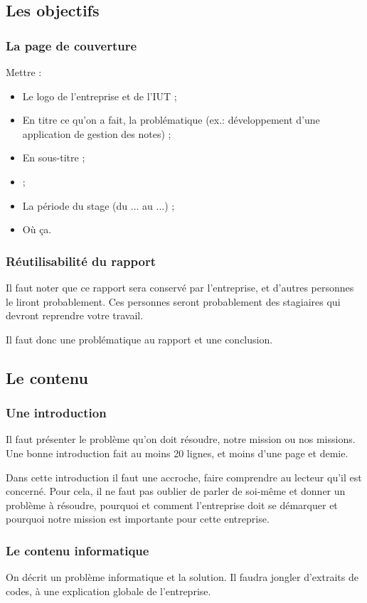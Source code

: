 \documentclass[final, a4paper, 11pt]{article}
\begin{document}
\subsection{Les objectifs}
\subsubsection{La page de couverture}
Mettre :
\begin{itemize}
	\item Le logo de l'entreprise et de l'IUT ;
	\item En titre ce qu'on a fait, la problématique (ex.: développement d'une application de gestion des notes) ;
	\item En sous-titre  ;
	\item {} ;
	\item La période du stage (du ... au ...) ;
	\item Où ça.
\end{itemize}

\subsubsection{Réutilisabilité du rapport}
Il faut noter que ce rapport sera conservé par l'entreprise, et d'autres personnes le liront probablement. Ces personnes seront probablement des stagiaires qui devront reprendre votre travail.

Il faut donc une problématique au rapport et une conclusion.

\subsection{Le contenu}
\subsubsection{Une introduction}
Il faut présenter le problème qu'on doit résoudre, notre mission ou nos missions. Une bonne introduction fait au moins 20 lignes, et moins d'une page et demie.

Dans cette introduction il faut une accroche, faire comprendre au lecteur qu'il est concerné. Pour cela, il ne faut pas oublier de parler de soi-même et donner un problème à résoudre, pourquoi et comment l'entreprise doit se démarquer et pourquoi notre mission est importante pour cette entreprise.

\subsubsection{Le contenu informatique}
On décrit un problème informatique et la solution. Il faudra jongler d'extraits de codes, à une explication globale de l'entreprise.
\end{document}
